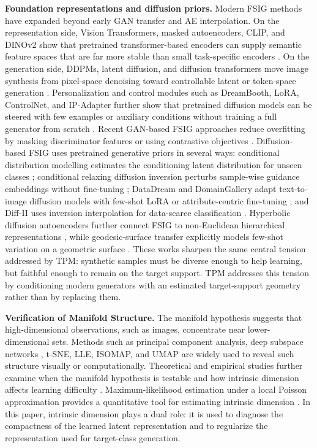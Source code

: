 \documentclass[preprint,12pt,number]{elsarticle}
\begin{document}
\textbf{Foundation representations and diffusion priors.} Modern FSIG methods have expanded beyond early GAN transfer and AE interpolation. On the representation side, Vision Transformers, masked autoencoders, CLIP, and DINOv2 show that pretrained transformer-based encoders can supply semantic feature spaces that are far more stable than small task-specific encoders \citep{dosovitskiy2021image, he2022masked, radford2021learning, oquab2024dinov2}. On the generation side, DDPMs, latent diffusion, and diffusion transformers move image synthesis from pixel-space denoising toward controllable latent or token-space generation \citep{ho2020denoising, rombach2022high, peebles2023scalable}. Personalization and control modules such as DreamBooth, LoRA, ControlNet, and IP-Adapter further show that pretrained diffusion models can be steered with few examples or auxiliary conditions without training a full generator from scratch \citep{ruiz2023dreambooth, hu2022lora, zhang2023adding, ye2023ipadapter}. Recent GAN-based FSIG approaches reduce overfitting by masking discriminator features or using contrastive objectives \citep{zhu2024masked, gou2024few}. Diffusion-based FSIG uses pretrained generative priors in several ways: conditional distribution modelling estimates the conditioning latent distribution for unseen classes \citep{gupta2024conditional}; conditional relaxing diffusion inversion perturbs sample-wise guidance embeddings without fine-tuning \citep{cao2024conditional}; DataDream and DomainGallery adapt text-to-image diffusion models with few-shot LoRA or attribute-centric fine-tuning \citep{kim2024datadream, duan2024domaingallery}; and Diff-II uses inversion interpolation for data-scarce classification \citep{wang2024inversion}. Hyperbolic diffusion autoencoders further connect FSIG to non-Euclidean hierarchical representations \citep{li2025hypdae}, while geodesic-surface transfer explicitly models few-shot variation on a geometric surface \citep{han2026few}. These works sharpen the same central tension addressed by TPM: synthetic samples must be diverse enough to help learning, but faithful enough to remain on the target support. TPM addresses this tension by conditioning modern generators with an estimated target-support geometry rather than by replacing them.

\textbf{Verification of Manifold Structure.} The manifold hypothesis suggests that high-dimensional observations, such as images, concentrate near lower-dimensional sets. Methods such as principal component analysis, deep subspace networks \citep{simon2020adaptive}, t-SNE, LLE, ISOMAP, and UMAP \citep{mcinnes2018umap} are widely used to reveal such structure visually or computationally. Theoretical and empirical studies further examine when the manifold hypothesis is testable and how intrinsic dimension affects learning difficulty \citep{fefferman2016testing, pope2021intrinsic}. Maximum-likelihood estimation under a local Poisson approximation provides a quantitative tool for estimating intrinsic dimension \citep{levina2004maximum}. In this paper, intrinsic dimension plays a dual role: it is used to diagnose the compactness of the learned latent representation and to regularize the representation used for target-class generation.
\end{document}
